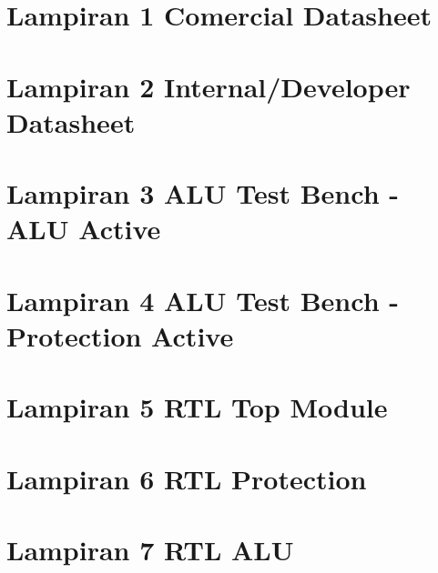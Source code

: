 
\chapter*{Lampiran 1 Comercial Datasheet}

\chapter*{Lampiran 2 Internal/Developer Datasheet}


\chapter*{Lampiran 3 ALU Test Bench - ALU Active}


\chapter*{Lampiran 4 ALU Test Bench - Protection Active}



\chapter*{Lampiran 5 RTL Top Module}


\chapter*{Lampiran 6 RTL Protection}


\chapter*{Lampiran 7 RTL ALU}
